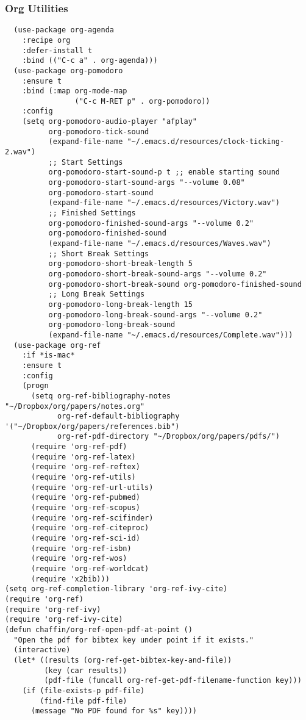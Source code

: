 \documentclass[11pt]{article}
\begin{document}
\subsubsection*{Org Utilities}
\label{sec:orgbc6b7af}

\begin{verbatim}
  (use-package org-agenda
    :recipe org
    :defer-install t
    :bind (("C-c a" . org-agenda)))
  (use-package org-pomodoro
    :ensure t
    :bind (:map org-mode-map
                ("C-c M-RET p" . org-pomodoro))
    :config
    (setq org-pomodoro-audio-player "afplay"
          org-pomodoro-tick-sound
          (expand-file-name "~/.emacs.d/resources/clock-ticking-2.wav")
          ;; Start Settings
          org-pomodoro-start-sound-p t ;; enable starting sound
          org-pomodoro-start-sound-args "--volume 0.08"
          org-pomodoro-start-sound
          (expand-file-name "~/.emacs.d/resources/Victory.wav")
          ;; Finished Settings
          org-pomodoro-finished-sound-args "--volume 0.2"
          org-pomodoro-finished-sound
          (expand-file-name "~/.emacs.d/resources/Waves.wav")
          ;; Short Break Settings
          org-pomodoro-short-break-length 5
          org-pomodoro-short-break-sound-args "--volume 0.2"
          org-pomodoro-short-break-sound org-pomodoro-finished-sound
          ;; Long Break Settings
          org-pomodoro-long-break-length 15
          org-pomodoro-long-break-sound-args "--volume 0.2"
          org-pomodoro-long-break-sound
          (expand-file-name "~/.emacs.d/resources/Complete.wav")))
  (use-package org-ref
    :if *is-mac*
    :ensure t
    :config
    (progn
      (setq org-ref-bibliography-notes "~/Dropbox/org/papers/notes.org"
            org-ref-default-bibliography '("~/Dropbox/org/papers/references.bib")
            org-ref-pdf-directory "~/Dropbox/org/papers/pdfs/")
      (require 'org-ref-pdf)
      (require 'org-ref-latex)
      (require 'org-ref-reftex)
      (require 'org-ref-utils)
      (require 'org-ref-url-utils)
      (require 'org-ref-pubmed)
      (require 'org-ref-scopus)
      (require 'org-ref-scifinder)
      (require 'org-ref-citeproc)
      (require 'org-ref-sci-id)
      (require 'org-ref-isbn)
      (require 'org-ref-wos)
      (require 'org-ref-worldcat)
      (require 'x2bib)))
(setq org-ref-completion-library 'org-ref-ivy-cite)
(require 'org-ref)
(require 'org-ref-ivy)
(require 'org-ref-ivy-cite)
(defun chaffin/org-ref-open-pdf-at-point ()
  "Open the pdf for bibtex key under point if it exists."
  (interactive)
  (let* ((results (org-ref-get-bibtex-key-and-file))
         (key (car results))
         (pdf-file (funcall org-ref-get-pdf-filename-function key)))
    (if (file-exists-p pdf-file)
        (find-file pdf-file)
      (message "No PDF found for %s" key))))


\end{verbatim}
\end{document}
